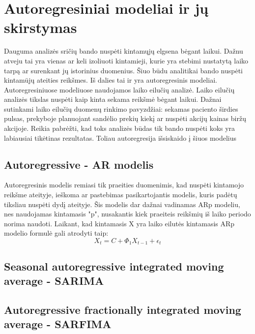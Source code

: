 \documentclass{VUMIFInfKursinis}
\begin{document}
\section{Autoregresiniai modeliai ir jų skirstymas}
Dauguma analizės sričių bando nuspėti kintamųjų elgsena bėgant laikui. Dažnu atveju tai yra vienas ar keli izoliuoti kintamieji, kurie yra stebimi nustatytą laiko
tarpą ar surenkant jų istorinius duomenius. Šiuo būdu analitikai bando nuspėti kintamūjų ateities reikšmes. Iš dalies tai ir yra autoregresinis modeliai. 
Autoregresiniuose modeliuose naudojamos laiko eilučių analizė. Laiko eilučių analizės tikslas nuspėti kaip kinta sekama reikšmė bėgant laikui. Dažnai sutinkami laiko eilučių
duomenų rinkimo pavyzdžiai: sekamas paciento širdies pulsas, prekyboje planuojant sandėlio prekių kiekį ar nuspėti akcijų kainas biržų akcijoje.
Reikia pabrėžti, kad toks analizės būdas tik bando nuspėti koks yra labiausiai tikėtinas rezultatas. Toliau autoregresija išsiskaido į šiuos modelius
\subsection{Autoregressive - AR modelis}
Autoregresinis modelis remiasi tik praeities duomenimis, kad nuspėti kintamojo reikšme ateityje, ieškoma ar pastebimas pasikartojantis modelis, kuris padėtų tiksliau nuspėti dydį ateityje.
Šis modelis dar dažnai vadinamas ARp modeliu, nes naudojamas kintamasis "p", nusakantis kiek praeiteis reikšmių iš laiko periodo norima naudoti.
Laikant, kad kintamasis X yra laiko eilutės kintamasis ARp modelio formulė gali atrodyti taip: \[X_{t} = C + \Phi _{1}X_{t-1}+\epsilon_{t} \]


\subsection{Seasonal autoregressive integrated moving average - SARIMA}

\subsection{Autoregressive fractionally integrated moving average - SARFIMA}

\end{document}
